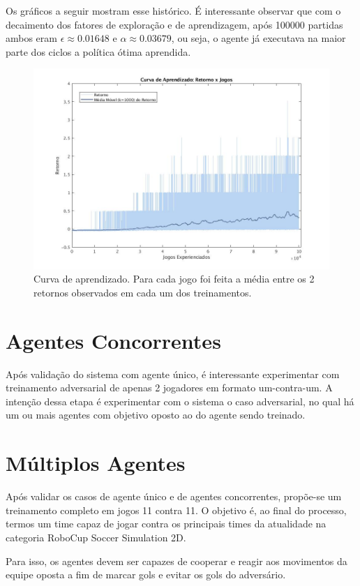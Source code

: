 Os gráficos a seguir mostram esse histórico. É interessante observar que com o decaimento dos fatores de exploração e de aprendizagem, após 100000 partidas ambos eram $\epsilon \approx 0.01648$ e $\alpha \approx 0.03679$, ou seja, o agente já executava na maior parte dos ciclos a política ótima aprendida.

\begin{figure}[h]
	\includegraphics[width=1.0\linewidth]{figs/curva-qtabular.jpg}
	\centering
	\caption{Curva de aprendizado. Para cada jogo foi feita a média entre os 2 retornos observados em cada um dos treinamentos.}
	\label{fig:single-agent-curva}
\end{figure}

\section{Agentes Concorrentes}

Após validação do sistema com agente único, é interessante experimentar com treinamento adversarial de apenas 2 jogadores em formato um-contra-um. A intenção dessa etapa é experimentar com o sistema o caso adversarial, no qual há um ou mais agentes com objetivo oposto ao do agente sendo treinado.

\section{Múltiplos Agentes}

Após validar os casos de agente único e de agentes concorrentes, propõe-se um treinamento completo em jogos 11 contra 11. O objetivo é, ao final do processo, termos um time capaz de jogar contra os principais times da atualidade na categoria RoboCup Soccer Simulation 2D.

Para isso, os agentes devem ser capazes de cooperar e reagir aos movimentos da equipe oposta a fim de marcar gols e evitar os gols do adversário.
